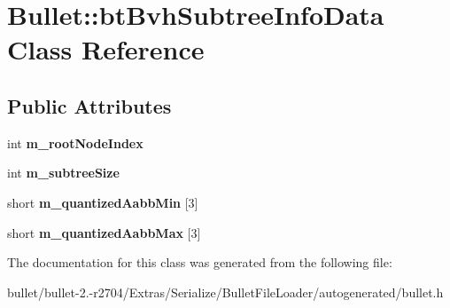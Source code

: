 \hypertarget{class_bullet_1_1bt_bvh_subtree_info_data}{\section{Bullet\+:\+:bt\+Bvh\+Subtree\+Info\+Data Class Reference}
\label{class_bullet_1_1bt_bvh_subtree_info_data}
}
\subsection*{Public Attributes}
\begin{DoxyCompactItemize}
\item 
\hypertarget{class_bullet_1_1bt_bvh_subtree_info_data_a33451e9f877b3253e42877a2341a3e1e}{int {\bfseries m\+\_\+root\+Node\+Index}}\label{class_bullet_1_1bt_bvh_subtree_info_data_a33451e9f877b3253e42877a2341a3e1e}

\item 
\hypertarget{class_bullet_1_1bt_bvh_subtree_info_data_a2d4ea82457e40bbbbc110a8689e62b58}{int {\bfseries m\+\_\+subtree\+Size}}\label{class_bullet_1_1bt_bvh_subtree_info_data_a2d4ea82457e40bbbbc110a8689e62b58}

\item 
\hypertarget{class_bullet_1_1bt_bvh_subtree_info_data_a8109bed0da2f8a64e53d48d1e8442e18}{short {\bfseries m\+\_\+quantized\+Aabb\+Min} \mbox{[}3\mbox{]}}\label{class_bullet_1_1bt_bvh_subtree_info_data_a8109bed0da2f8a64e53d48d1e8442e18}

\item 
\hypertarget{class_bullet_1_1bt_bvh_subtree_info_data_afaf5191e3d6e41b8a6fa1aade794e236}{short {\bfseries m\+\_\+quantized\+Aabb\+Max} \mbox{[}3\mbox{]}}\label{class_bullet_1_1bt_bvh_subtree_info_data_afaf5191e3d6e41b8a6fa1aade794e236}

\end{DoxyCompactItemize}


The documentation for this class was generated from the following file\+:\begin{DoxyCompactItemize}
\item 
bullet/bullet-\/2.-\/r2704/\+Extras/\+Serialize/\+Bullet\+File\+Loader/autogenerated/bullet.\+h\end{DoxyCompactItemize}
